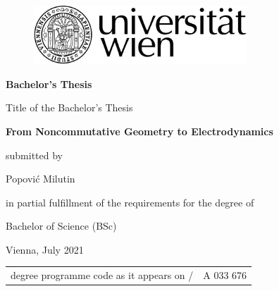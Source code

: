 \begin{titlepage}

\begin{center}
\begin{figure}
\hspace{8.8cm}
\includegraphics[width=8cm]{pics/uni_logo}
\end{figure}
\vspace*{1cm}

    \fontsize{22}{0} \selectfont \textbf{Bachelor's Thesis}\\

\vspace*{2.5cm}

\fontsize{12}{0} \selectfont Title of the Bachelor's Thesis\\

\vspace*{0.4cm}

\fontsize{18}{0} \selectfont \textbf{From Noncommutative Geometry to
Electrodynamics}\\

\vspace*{1.5cm}

    {\fontsize{12}{0} \selectfont submitted by}\\
\vspace*{0.4cm}

    { \fontsize{14}{0} \selectfont Popović Milutin}\\

\vspace*{2cm}

    {\fontsize{12}{0} \selectfont  in partial fulfillment of the requirements for the degree of}\\
\vspace*{0.4cm}

    { \fontsize{14}{0} \selectfont Bachelor of Science (BSc)}\\
\vspace*{2cm}

    { \fontsize{12}{0} \selectfont Vienna, July 2021}\\

\vspace*{3.5cm}

\begin{tabular}{p{9cm}p{11.25cm}}
        \fontsize{12}{0} \selectfont degree programme code as it appears on / &
        \fontsize{12}{0} \selectfont A 033 676 \\


\end{tabular}
\end{center}
\end{titlepage}
